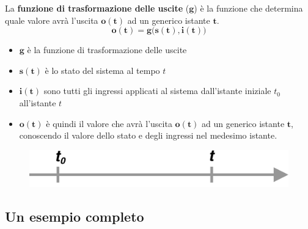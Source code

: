 \begin{frame}
	
	\begin{block}{La \textbf{funzione di trasformazione delle uscite} ($\pmb{g}$)}
		è la funzione che determina quale valore avrà l'uscita $\pmb{o(t)}$ ad un generico istante $\pmb{t}$.
		$$\pmb{o(t) = g\Big(s(t), i(t)\Big)}$$
		
		\begin{itemize}
			\item $\pmb{g}$ è la funzione di trasformazione delle uscite
			\item $\pmb{s(t)}$ è lo stato del sistema al tempo $t$
			\item $\pmb{i(t)}$ sono tutti gli ingressi applicati al sistema dall'istante iniziale $t_0$ all'istante $t$
			\item $\pmb{o(t)}$ è quindi il valore che avrà l'uscita $\pmb{o(t)}$ ad un generico istante $\pmb{t}$, conoscendo il valore dello stato e degli ingressi nel medesimo istante.
		\end{itemize}
		
		\begin{figure}[!htbp]
			\centering
			\includegraphics[width=0.50\linewidth]{images/1_i_sistemi/sistemaF.pdf}
		\end{figure}
	\end{block}
\end{frame}



\subsection[Un esempio completo]{Un esempio completo}


